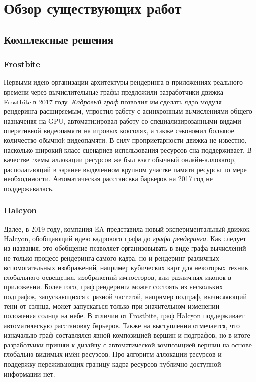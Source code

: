 \section{Обзор существующих работ}
\subsection{Комплексные решения}
\subsubsection*{Frostbite}
Первыми идею организации архитектуры рендеринга в приложениях реального времени через вычислительные графы предложили разработчики движка Frostbite в 2017 году\cite{FrostbiteGdcTalk}. \textit{Кадровый граф} позволил им сделать ядро модуля рендеринга расширяемым, упростил работу с асинхронным вычислениями общего назначения на GPU, автоматизировал работу со специализированными видами оперативной видеопамяти на игровых консолях, а также сэкономил большое количество обычной видеопамяти. В силу проприетарности движка не известно, насколько широкий класс сценариев использования ресурсов она поддерживает. В качестве схемы аллокации ресурсов же был взят обычный онлайн-аллокатор, располагающий в заранее выделенном крупном участке памяти ресурсы по мере необходимости. Автоматическая расстановка барьеров на 2017 год не поддерживалась.

\subsubsection*{Halcyon}
Далее, в 2019 году, компания EA представила\cite{HalcyonRapidInnovationTalk} новый экспериментальный движок Halcyon, обобщающий идею кадрового графа до \textit{графа рендеринга}. Как следует из названия, это обобщение позволяет организовывать в виде графа вычислений не только процесс рендеринга самого кадра, но и рендеринг различных вспомогательных изображений, например кубических карт для некоторых техник глобального освещения, изображений импосторов, или различных иконок в приложении. Более того, граф рендеринга может состоять из нескольких подграфов, запускающихся с разной частотой, например подграф, вычисляющий тени от солнца, может запускаться только при значительном изменении положения солнца на небе. В отличии от Frostbite, граф Halcyon поддерживает автоматическую расстановку барьеров. Также на выступлении отмечается, что изначально граф составлялся явной композицией вершин и подграфов, но в итоге разработчики пришли к дизайну с автоматической композицией вершин на основе глобально видимых имён ресурсов. Про алгоритм аллокации ресурсов и поддержку переживающих границу кадра ресурсов публично доступной информации нет.

